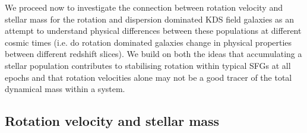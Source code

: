 \documentclass[fleqn,usenatbib]{mn2e}
\begin{document}
We proceed now to investigate the connection between rotation velocity and stellar mass for the rotation and dispersion dominated KDS field galaxies as an attempt to understand physical differences between these populations at different cosmic times (i.e. do rotation dominated galaxies change in physical properties between different redshift slices).
We build on both the ideas that accumulating a stellar population contributes to stabilising rotation within typical SFGs at all epochs and that rotation velocities alone may not be a good tracer of the total dynamical mass within a system. 

\subsection{Rotation velocity and stellar mass}\label{subsec:TF}
\end{document}
